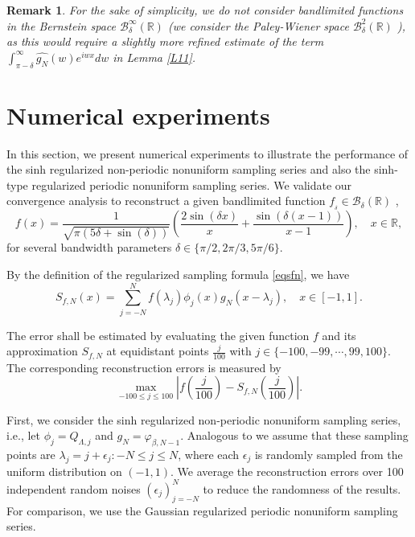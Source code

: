 \documentclass[a4paper]{article}
\newtheorem{remark}[theorem]{\bf Remark}
\numberwithin{equation}{section}
\begin{document}
\begin{remark}
For the sake of simplicity, we do not consider bandlimited functions in the Bernstein space $\mathcal{B}_{\delta}^{\infty}(\mathbb{R})$ (we consider the Paley-Wiener space $\mathcal{B}_{\delta}^{2}(\mathbb{R})$ ), as this would require a slightly more refined estimate of the term $\int_{\pi-\delta}^{\infty}\widehat{g_{N}}(w)e^{iwx}dw$ in Lemma \ref{L11}.  
\end{remark}





\section{Numerical experiments}

In this section, we present numerical experiments to illustrate the performance of the sinh regularized  non-periodic nonuniform sampling series and also  the sinh-type regularized periodic nonuniform sampling series.  We validate our convergence analysis to reconstruct a given bandlimited function $f_{_\delta}\in \mathcal{B}_\delta (\mathbb{R})$ \cite{yang2025exponential}, 
\begin{equation}
\label{funcexample}
f(x) = \frac{1}{\sqrt{\pi(5\delta + \sin (\delta))}} \left( \frac{2 \sin (\delta x)}{x} + \frac{\sin (\delta (x - 1))}{x - 1} \right), \quad x \in \mathbb{R},
\end{equation}
for several bandwidth parameters $\delta \in \{\pi/2, 2\pi/3, 5\pi/6\}$.

 By the definition of the regularized  sampling formula \eqref{eqsfn}, we have
\[
S_{f,N}(x)=\sum_{j=-N}^{N}f(\lambda_j)\phi_{j}(x)g_{N}(x-\lambda_j),\quad x\in[-1,1].
\]

The error shall be estimated by evaluating the given function $f$ and its approximation $S_{f,N}$ at equidistant points $\frac{j}{100}$ with $ j \in \{-100,-99,\cdots,99,100\}$. The corresponding reconstruction errors is measured by
\begin{equation}
\label{errormeasure}  
\max_{-100\leq j \leq 100}\left|f\left(\frac{j}{100}\right)-S_{f,N}\left(\frac{j}{100}\right)\right|.
\end{equation}

First, we consider the sinh regularized  non-periodic nonuniform sampling series, i.e., let $\phi_{j}=Q_{\Lambda,j}$ and $g_{N}=\varphi_{\beta,N-1}$.  Analogous to \cite{yang2025exponential}  we  assume that these sampling points are $\lambda_j = j + \epsilon_j : -N \leq j \leq N$, where  each $\epsilon_j$ is randomly sampled from the uniform distribution on $(-1, 1)$. We average the reconstruction errors over 100 independent random noises $(\epsilon_j)_{j=-N}^{N}$ to reduce the randomness of the results. For  comparison, we use the Gaussian regularized periodic nonuniform sampling series.
\end{document}
